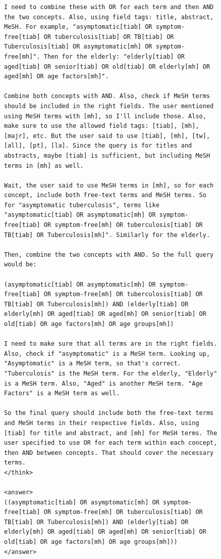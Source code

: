 \begin{figure}[p]
\begin{CombinedBox}
\begin{lstlisting}
I need to combine these with OR for each term and then AND the two concepts. Also, using field tags: title, abstract, MeSH. For example, "asymptomatic[tiab] OR symptom-free[tiab] OR tuberculosis[tiab] OR TB[tiab] OR Tuberculosis[tiab] OR asymptomatic[mh] OR symptom-free[mh]". Then for the elderly: "elderly[tiab] OR aged[tiab] OR senior[tiab] OR old[tiab] OR elderly[mh] OR aged[mh] OR age factors[mh]".

Combine both concepts with AND. Also, check if MeSH terms should be included in the right fields. The user mentioned using MeSH terms with [mh], so I'll include those. Also, make sure to use the allowed field tags: [tiab], [mh], [majr], etc. But the user said to use [tiab], [mh], [tw], [all], [pt], [la]. Since the query is for titles and abstracts, maybe [tiab] is sufficient, but including MeSH terms in [mh] as well.

Wait, the user said to use MeSH terms in [mh], so for each concept, include both free-text terms and MeSH terms. So for "asymptomatic tuberculosis", terms like "asymptomatic[tiab] OR asymptomatic[mh] OR symptom-free[tiab] OR symptom-free[mh] OR tuberculosis[tiab] OR TB[tiab] OR Tuberculosis[mh]". Similarly for the elderly.

Then, combine the two concepts with AND. So the full query would be:

(asymptomatic[tiab] OR asymptomatic[mh] OR symptom-free[tiab] OR symptom-free[mh] OR tuberculosis[tiab] OR TB[tiab] OR Tuberculosis[mh]) AND (elderly[tiab] OR elderly[mh] OR aged[tiab] OR aged[mh] OR senior[tiab] OR old[tiab] OR age factors[mh] OR age groups[mh])

I need to make sure that all terms are in the right fields. Also, check if "asymptomatic" is a MeSH term. Looking up, "Asymptomatic" is a MeSH term, so that's correct. "Tuberculosis" is the MeSH term. For the elderly, "Elderly" is a MeSH term. Also, "Aged" is another MeSH term. "Age Factors" is a MeSH term as well.

So the final query should include both the free-text terms and MeSH terms in their respective fields. Also, using [tiab] for title and abstract, and [mh] for MeSH terms. The user specified to use OR for each term within each concept, then AND between concepts. That should cover the necessary terms.
</think>

<answer>
((asymptomatic[tiab] OR asymptomatic[mh] OR symptom-free[tiab] OR symptom-free[mh] OR tuberculosis[tiab] OR TB[tiab] OR Tuberculosis[mh]) AND (elderly[tiab] OR elderly[mh] OR aged[tiab] OR aged[mh] OR senior[tiab] OR old[tiab] OR age factors[mh] OR age groups[mh]))
</answer>
		\end{lstlisting}
		

\end{CombinedBox}
\end{figure}

